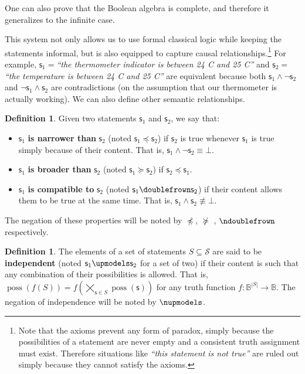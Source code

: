 \documentclass[letterpaper]{article}
\theoremstyle{plain}%
\theoremstyle{definition}
\newtheorem{defn}[thrm]{Definition}
\theoremstyle{remark}
\numberwithin{equation}{section}
\DeclareMathOperator{\possFn}{poss}
\def\contradiction{\bot}
\def\comp{\doublefrown}
\def\ncomp{\ndoublefrown}
\def\narrower{\preccurlyeq}
\def\nnarrower{\npreccurlyeq}
\def\broader{\succcurlyeq}
\def\nbroader{\nsucccurlyeq}
\def\indep{\upmodels}
\def\nindep{\nupmodels}
\def\AND{\wedge}
\def\NOT{\neg}
\newcommand{\stmt}[1][s] {\mathsf{#1}}
\newcommand{\statement}[1] {\emph{``#1''}}
\begin{document}
One can also prove that the Boolean algebra is complete, and therefore it generalizes to the infinite case.

This system not only allows us to use formal classical logic while keeping the statements informal, but is also equipped to capture causal relationships.\footnote{Note that the axioms prevent any form of paradox, simply because the possibilities of a statement are never empty and a consistent truth assignment must exist. Therefore situations like \statement{this statement is not true} are ruled out simply because they cannot satisfy the axioms.} For example, $\stmt_1=$\statement{the thermometer indicator is between 24 C and 25 C} and $\stmt_2=$\statement{the temperature is between 24 C and 25 C} are equivalent because both $\stmt_1 \AND \NOT \stmt_2$ and $\NOT \stmt_1 \AND \stmt_2$ are contradictions (on the assumption that our thermometer is actually working). We can also define other semantic relationships.

\begin{defn}
	Given two statements $\stmt_1$ and $\stmt_2$, we say that:
	\begin{itemize}
		\item $\stmt_1$ \textbf{is narrower than} $\stmt_2$ (noted $\stmt_1 \narrower \stmt_2$) if $\stmt_2$ is true whenever $\stmt_1$ is true simply because of their content. That is, $\stmt_1 \AND \NOT \stmt_2 \equiv \contradiction$.
		\item $\stmt_1$ \textbf{is broader than} $\stmt_2$ (noted $\stmt_1 \broader \stmt_2$) if $\stmt_2 \narrower \stmt_1$.
		\item $\stmt_1$ \textbf{is compatible to} $\stmt_2$ (noted $\stmt_1 \comp \stmt_2$) if their content allows them to be true at the same time. That is, $\stmt_1 \AND \stmt_2 \nequiv \contradiction$.
		
	\end{itemize}
	The negation of these properties will be noted by $\nnarrower$, $\nbroader$ , $\ncomp$ respectively.
\end{defn}
\begin{defn}
	The elements of a set of statements $S \subseteq \mathcal{S}$ are said to be \textbf{independent} (noted $\stmt_1 \indep \stmt_2$ for a set of two) if their content is such that any combination of their possibilities is allowed. That is, $\possFn(f(S)) = f(\bigtimes\limits_{\stmt \in S} \possFn(\stmt))$ for any truth function $f : \mathbb{B}^{|S|} \to \mathbb{B}$. The negation of independence will be noted by $\nindep$.
\end{defn}
\end{document}

